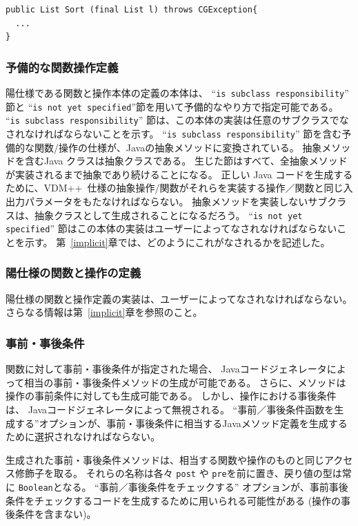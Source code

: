 \documentclass[\pformat,11pt]{jarticle}
\newcommand{\VDM}{VDM++}
\newcommand{\cg}{Javaコードジェネレータ}
\begin{document}
\begin{screen}
\begin{verbatim}
public List Sort (final List l) throws CGException{
  ...
}
\end{verbatim}
\end{screen}

\subsubsection{予備的な関数操作定義}

陽仕様である関数と操作本体の定義の本体は、 ``{\tt is subclass responsibility}'' 節と ``{\tt is not yet specified}''節を用いて予備的なやり方で指定可能である。
 ``{\tt is subclass responsibility}'' 節は、この本体の実装は任意のサブクラスでなされなければならないことを示す。
``{\tt is subclass responsibility}'' 節を含む予備的な関数/操作の仕様が、Javaの抽象メソッドに変換されている。
抽象メソッドを含むJava クラスは抽象クラスである。
生じた節はすべて、全抽象メソッドが実装されるまで抽象であり続けることになる。
正しい Java コードを生成するために、\VDM\ 仕様の抽象操作/関数がそれらを実装する操作／関数と同じ入出力パラメータをもたなければならない。
抽象メソッドを実装しないサブクラスは、抽象クラスとして生成されることになるだろう。
 ``{\tt is not yet specified}'' 節はこの本体の実装はユーザーによってなされなければならないことを示す。 
第~\ref{implicit}章では、どのようにこれがなされるかを記述した。

\subsubsection{陽仕様の関数と操作の定義}
陽仕様の関数と操作定義の実装は、ユーザーによってなされなければならない。
さらなる情報は第~\ref{implicit}章を参照のこと。

\subsubsection{事前・事後条件}
関数に対して事前・事後条件が指定された場合、 \cg{}によって相当の事前・事後条件メソッドの生成が可能である。
さらに、メソッドは操作の事前条件に対しても生成可能である。
しかし、操作における事後条件は、 \cg{}によって無視される。
 ``事前／事後条件函数を生成する''オプションが、事前・事後条件に相当するJavaメソッド定義を生成するために選択されなければならない。

生成された事前・事後条件メソッドは、相当する関数や操作のものと同じアクセス修飾子を取る。
それらの名称は各々 {\tt post} や {\tt pre}を前に置き、戻り値の型は常に {\tt Boolean}となる。
 ``事前／事後条件をチェックする'' オプションが、事前事後条件をチェックするコードを生成するために用いられる可能性がある
 (操作の事後条件を含まない)。
\end{document}
